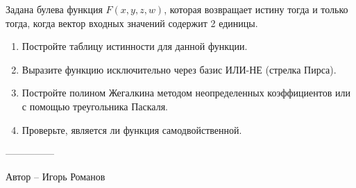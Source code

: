 \question
Задана булева функция $F(x,y,z,w)$, которая возвращает истину тогда и только тогда, когда вектор входных значений содержит 2 единицы.
\begin{enumerate}
\item Постройте таблицу истинности для данной функции.
\item Выразите функцию исключительно через базис ИЛИ-НЕ (стрелка Пирса).
\item Постройте полином Жегалкина методом неопределенных коэффициентов или с помощью треугольника Паскаля.
\item Проверьте, является ли функция самодвойственной.
\end{enumerate}

---------------

Автор -- Игорь Романов
